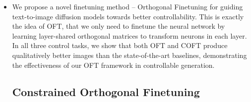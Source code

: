 \begin{itemize}[leftmargin=*,nosep]

    \item We propose a novel finetuning method -- Orthogonal Finetuning for guiding text-to-image diffusion models towards better controllability. This is exactly the idea of OFT, that we only need to finetune the neural network by learning layer-shared orthogonal matrices to transform neurons in each layer. In all three control tasks, we show that both OFT and COFT produce qualitatively better images than the state-of-the-art baselines, demonstrating the effectiveness of our OFT framework in controllable generation. \subsection{Constrained Orthogonal Finetuning}


\end{itemize}
